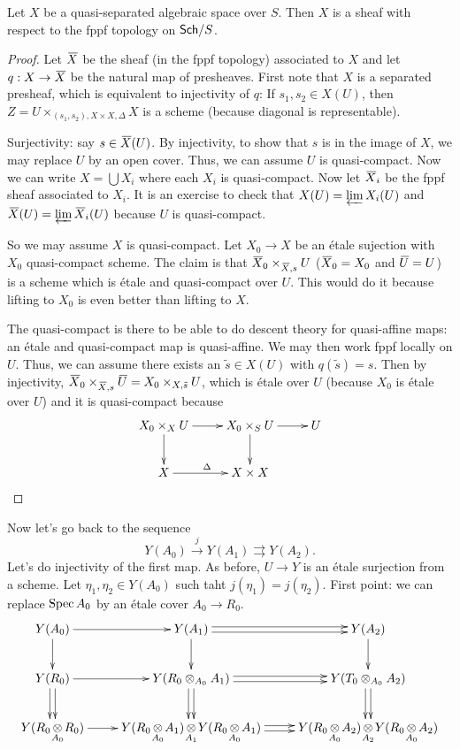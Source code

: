 \begin{theorem}
  Let $X$ be a quasi-separated algebraic space over $S$. Then $X$ is
a sheaf with respect to the fppf topology on $\text{\sf Sch}/S$.
\end{theorem}
\begin{proof}
  Let $\bbar X$ be the sheaf (in the fppf topology) associated to $X$
and let $q:X\to \bbar X$ be the natural map of presheaves. First note
that $X$ is a separated presheaf, which is equivalent to injectivity
of $q$: If $s_1,s_2\in X(U)$, then $Z=U\times_{(s_1,s_2),X\times
X,\Delta} X$ is a scheme (because diagonal is representable).

  Surjectivity: say $s\in \bbar X(U)$. By injectivity, to show that
$s$ is in the image of $X$, we may replace $U$ by an open cover.
Thus, we can assume $U$ is quasi-compact. Now we can write $X=\bigcup
X_i$ where each $X_i$ is quasi-compact. Now let $\bbar X_i$ be the
fppf sheaf associated to $X_i$. It is an exercise to check that
$X(U)=\varprojlim X_i(U)$ and $\bbar X(U)=\varprojlim \bbar X_i(U)$
because $U$ is quasi-compact.

  So we may assume $X$ is quasi-compact. Let $X_0\to X$ be an \'etale
sujection with $X_0$ quasi-compact scheme. The claim is that $\bbar
X_0\times_{\bbar X,s} U$ ($\bbar X_0=X_0$ and $\bbar U=U$) is a
scheme which is \'etale and quasi-compact over $U$. This would do it
because lifting to $X_0$ is even better than lifting to $X$.

  The quasi-compact is there to be able to do descent theory for
quasi-affine maps: an \'etale and quasi-compact map is quasi-affine.
We may then work fppf locally on $U$. Thus, we can assume there
exists an $\tilde s\in X(U)$ with $q(\tilde s)=s$. Then by
injectivity, $\bbar X_0\times_{\bbar X,s} \bbar U=X_0\times_{X,\tilde
s} U$, which is \'etale over $U$ (because $X_0$ is \'etale over $U$)
and it is quasi-compact because
  \[\xymatrix{
    X_0\times_X U\ar[d] \ar[r] & X_0\times_S U\ar[r]\ar[d] & U\\
    X\ar[r]^\Delta & X\times X
  }\]
\end{proof}
Now let's go back to the sequence
\[
  Y(A_0)\xrightarrow{j} Y(A_1)\rightrightarrows Y(A_2).
\]
Let's do injectivity of the first map. As before, $U\to Y$ is an
\'etale surjection from a scheme. Let $\eta_1,\eta_2\in Y(A_0)$ such
taht $j(\eta_1)=j(\eta_2)$. First point: we can replace $\operatorname{Spec} A_0$
by an \'etale cover $A_0\to R_0$.
\[\def\oA#1{\smash{\underset{A_{#1}}{\,\otimes\,}}}
 \xymatrix{
  Y(A_0)\ar[d]\ar[r] & Y(A_1)\ar[d]\ar@<.5ex>[r]\ar@<-.5ex>[r] &
Y(A_2)\ar[d]\\
  Y(R_0)\ar@<.5ex>[d]\ar@<-.5ex>[d]\ar[r] & Y(R_0\otimes_{A_0} A_1)
\ar@<.5ex>[d]\ar@<-.5ex>[d] \ar@<.5ex>[r]\ar@<-.5ex>[r] &
Y(T_0\otimes_{A_0} A_2)\ar@<.5ex>[d]\ar@<-.5ex>[d]\\
  Y(R_0\oA0 R_0) \ar[r] & Y(R_0\oA0 A_1)\oA1 Y(R_0\oA0 A_1)
\ar@<.5ex>[r]\ar@<-.5ex>[r] & Y(R_0\oA0 A_2)\oA2 Y(R_0\oA0 A_2)
}\]
